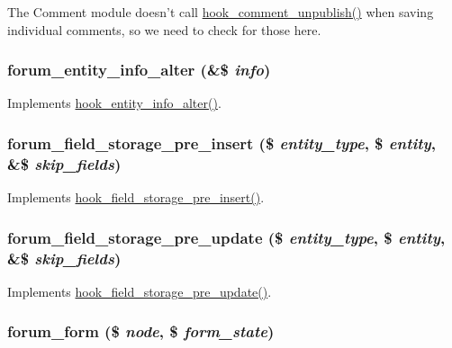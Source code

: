 The Comment module doesn't call \hyperlink{group__hooks_gaed97e1a1eaedd7b482f881ea2b8a3876}{hook\_\-comment\_\-unpublish()} when saving individual comments, so we need to check for those here. \hypertarget{forum_8module_a30c4ed7429841ff6f564f958a875e2e8}{
\subsubsection[{forum\_\-entity\_\-info\_\-alter}]{\setlength{\rightskip}{0pt plus 5cm}forum\_\-entity\_\-info\_\-alter (\&\$ {\em info})}}
\label{forum_8module_a30c4ed7429841ff6f564f958a875e2e8}
Implements \hyperlink{group__hooks_ga0394a72e4872603e91ce22440195ab45}{hook\_\-entity\_\-info\_\-alter()}. \hypertarget{forum_8module_abafaf758d9a36d98c276125631c304ae}{
\subsubsection[{forum\_\-field\_\-storage\_\-pre\_\-insert}]{\setlength{\rightskip}{0pt plus 5cm}forum\_\-field\_\-storage\_\-pre\_\-insert (\$ {\em entity\_\-type}, \/  \$ {\em entity}, \/  \&\$ {\em skip\_\-fields})}}
\label{forum_8module_abafaf758d9a36d98c276125631c304ae}
Implements \hyperlink{group__field__storage_gaa4fa274b87c435d41fc9267adedbec79}{hook\_\-field\_\-storage\_\-pre\_\-insert()}. \hypertarget{forum_8module_afac99913c3649631f36b8200bd3ee2b2}{
\subsubsection[{forum\_\-field\_\-storage\_\-pre\_\-update}]{\setlength{\rightskip}{0pt plus 5cm}forum\_\-field\_\-storage\_\-pre\_\-update (\$ {\em entity\_\-type}, \/  \$ {\em entity}, \/  \&\$ {\em skip\_\-fields})}}
\label{forum_8module_afac99913c3649631f36b8200bd3ee2b2}
Implements \hyperlink{group__field__storage_ga3cc35769d019ea0dcfedc7ca6b084983}{hook\_\-field\_\-storage\_\-pre\_\-update()}. \hypertarget{forum_8module_a882c25e89e68340b62134d83ebb6fbd1}{
\subsubsection[{forum\_\-form}]{\setlength{\rightskip}{0pt plus 5cm}forum\_\-form (\$ {\em node}, \/  \$ {\em form\_\-state})}}
